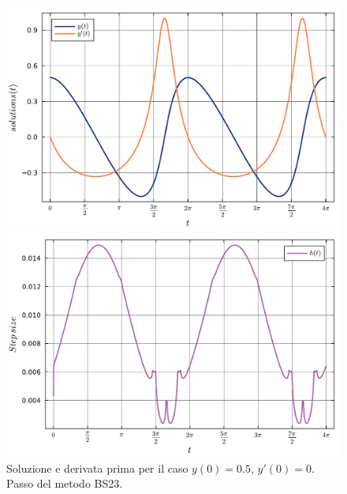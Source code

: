 \documentclass[letterpaper, 12pt]{article}
\numberwithin{equation}{section}    %
\begin{document}
\begin{figure}[!ht]
    \centering
    \begin{minipage}[b]{0.47\textwidth}
        \includegraphics[width=\textwidth]{6363.pdf}
    \end{minipage}
    \hspace{0.5cm}
    \begin{minipage}[b]{0.47\textwidth}
        \includegraphics[width=\textwidth]{6364.pdf}
    \end{minipage}
    \caption{Soluzione e derivata prima per il caso $y(0) = 0.5$, $y'(0) = 0$. Passo del metodo BS23.}
    \label{fig:es6_3_6_2}
\end{figure}
\end{document}
